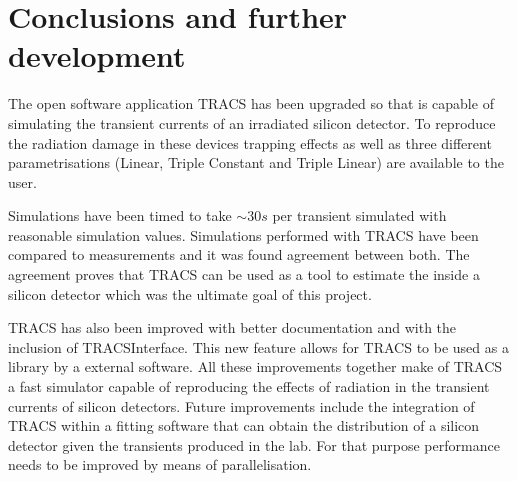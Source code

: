 \chapter{Conclusions and further development}

The open software application TRACS has been upgraded so that is capable of simulating the transient currents of an irradiated silicon detector. To reproduce the radiation damage in these devices trapping effects as well as three different \neff parametrisations (Linear, Triple Constant and Triple Linear) are available to the user. 

Simulations have been timed to take $\sim 30s$ per transient simulated with reasonable simulation values. Simulations performed with TRACS have been compared to measurements and it was found agreement between both. The agreement proves that TRACS can be used as a tool to estimate the \neff inside a silicon detector which was the ultimate goal of this project.

TRACS has also been improved with better documentation and with the inclusion of TRACSInterface. This new feature allows for TRACS to be used as a library by a external software.  All these improvements together make of TRACS a fast simulator capable of reproducing the effects of radiation in the transient currents of silicon detectors. Future improvements include the integration of TRACS within a fitting software that can obtain the \neff distribution of a silicon detector given the transients produced in the lab. For that purpose performance needs to be improved by means of parallelisation.


